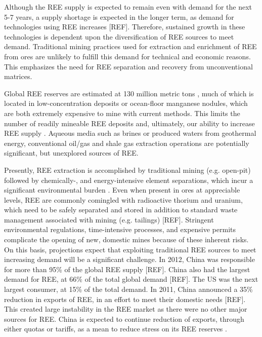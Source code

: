Although the REE supply is expected to remain even with demand for the next 5-7 years, a supply shortage is expected in the longer term, as demand for technologies using REE increases [REF].
Therefore, sustained growth in these technologies is dependent upon the diversification of REE sources to meet demand.
Traditional mining practices used for extraction and enrichment of REE from ores are unlikely to fulfill this demand for technical and economic reasons.
This emphasizes the need for REE separation and recovery from unconventional matrices.

Global REE reserves are estimated at 130 million metric tons \citep{USGS_commsumm}, much of which is located in low-concentration deposits or ocean-floor manganese nodules, which are both extremely expensive to mine with current methods.
This limits the number of readily mineable REE deposits and, ultimately, our ability to increase REE supply \citep{JRC_2011, Alonso_EST_2012}.
Aqueous media such as brines or produced waters from geothermal energy, conventional oil/gas and shale gas extraction operations are potentially significant, but unexplored sources of REE.

Presently, REE extraction is accomplished by traditional mining (e.g. open-pit) followed by chemically-, and energy-intensive element separations, which incur a significant environmental burden \citep{Zaimes_SCE_2015}.
Even when present in ores at appreciable levels, REE are commonly comingled with radioactive thorium and uranium, which need to be safely separated and stored in addition to standard waste management associated with mining (e.g. tailings) [REF].
Stringent environmental regulations, time-intensive processes, and expensive permits complicate the opening of new, domestic mines because of these inherent risks.
On this basis, projections expect that exploiting traditional REE sources to meet increasing demand will be a significant challenge.
In 2012, China was responsible for more than 95\% of the global REE supply [REF].
China also had the largest demand for REE, at 66\% of the total global demand [REF].
The US was the next largest consumer, at 15\% of the total demand.
In 2011, China announced a 35\% reduction in exports of REE, in an effort to meet their domestic needs [REF].
This created large instability in the REE market as there were no other major sources for REE.
China is expected to continue reduction of exports, through either quotas or tariffs, as a mean to reduce stress on its REE reserves \citep{FrostSullivan_REEmarket, USGS_commsumm}.


